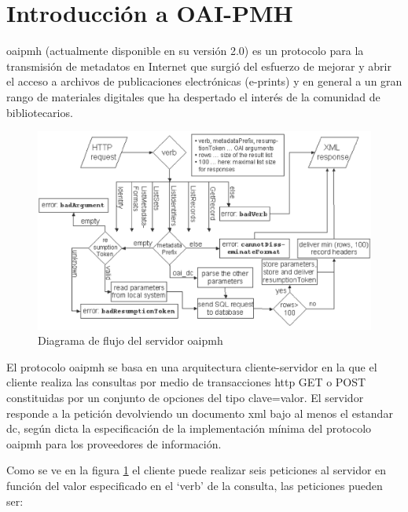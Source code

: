 \section{Introducción a OAI-PMH}

\acrfull{oaipmh} (actualmente disponible en su versión 2.0) es un protocolo para la transmisión de metadatos en Internet que surgió del esfuerzo de mejorar y abrir el acceso a archivos de publicaciones electrónicas (e-prints) y en general a un gran rango de materiales digitales que ha despertado el interés de la comunidad de bibliotecarios.\cite{JM_OAI}

\begin{figure}[!htp]
	\centering
	\includegraphics[scale=.15]{fig/oai_flow}
	\caption{Diagrama de flujo del servidor \acrshort{oaipmh}}\label{fig:oaiflow}
\end{figure}

El protocolo \acrshort{oaipmh} se basa en una arquitectura cliente-servidor en la que el cliente realiza las consultas por medio de transacciones \acrshort{http} GET o POST constituidas por un conjunto de opciones del tipo clave=valor. El servidor responde a la petición devolviendo un documento \acrshort{xml} bajo al menos el estandar \acrfull{dc}, según dicta la especificación de la implementación mínima del protocolo \acrshort{oaipmh} para los proveedores de información.\cite{OAIPMH_implementers}

Como se ve en la figura \ref{fig:oaiflow}\cite{oai_implementation} el cliente puede realizar seis peticiones al servidor en función del valor especificado en el `verb' de la consulta, las peticiones pueden ser:

